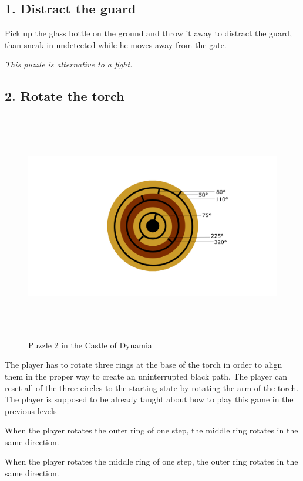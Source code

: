 \subsection{1. Distract the guard}

Pick up the glass bottle on the ground and throw it away to distract the guard, than sneak in undetected while he moves away from the gate.

\textit{This puzzle is alternative to a fight.}


\subsection{2. Rotate the torch}

\begin{figure}[H]
  \centering
  \includegraphics[height=10cm]{Images/Puzzles/castleOfDynamia2}
  \caption{Puzzle 2 in the Castle of Dynamia}
\end{figure}

The player has to rotate three rings at the base of the torch in order to align them in the proper way to create an uninterrupted black path. The player can reset all of the three circles to the starting state by rotating the arm of the torch. The player is supposed to be already taught about how to play this game in the previous levels

When the player rotates the outer ring of one step, the middle ring rotates in the same direction.

When the player rotates the middle ring of one step, the outer ring rotates in the same direction.

